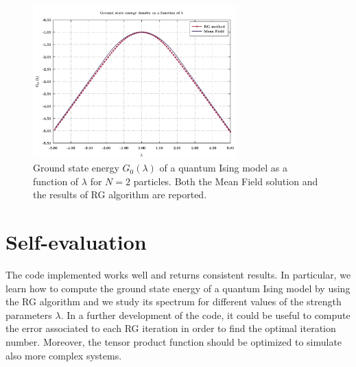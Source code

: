 \documentclass[rmp,10pt,onecolumn,fleqn,notitlepage]{revtex4-1}
\begin{document}
\begin{figure}[h!]
\centering
\includegraphics[width=0.7\textwidth]{image/RG_ground_state.pdf}
\caption{\label{fig:result} Ground state energy \( G_0 (\lambda )\) of a quantum Ising model as a function of \( \lambda  \) for \( N=2 \) particles. Both the Mean Field solution and the results of RG algorithm are reported.}
\end{figure}




\section{Self-evaluation}
The code implemented works well and returns consistent results. In particular, we learn how to compute the ground state energy of a quantum Ising model by using the RG algorithm and we study its spectrum for different values of the strength parameters \( \lambda  \). In a further development of the code, it could be useful to compute the error associated to each RG iteration in order to find the optimal iteration number. Moreover, the tensor product function should be optimized to simulate also more complex systems.
\end{document}
